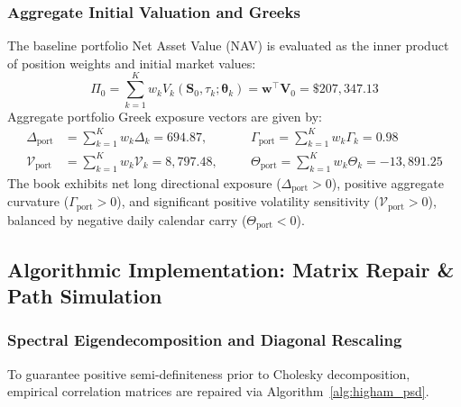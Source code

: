 \documentclass{article}
\theoremstyle{plain}
\theoremstyle{definition}
\theoremstyle{remark}
\begin{document}
\subsubsection{Aggregate Initial Valuation and Greeks}
The baseline portfolio Net Asset Value (NAV) is evaluated as the inner product of position weights and initial market values:
\begin{equation}
    \Pi_0 = \sum_{k=1}^K w_k V_k(\mathbf{S}_0, \tau_k; \boldsymbol{\theta}_k) = \mathbf{w}^\top \mathbf{V}_0 = \$207,347.13
\end{equation}
Aggregate portfolio Greek exposure vectors are given by:
\begin{align}
    \Delta_{\text{port}} &= \sum_{k=1}^K w_k \Delta_k = 694.87, \quad && \Gamma_{\text{port}} = \sum_{k=1}^K w_k \Gamma_k = 0.98 \\
    \mathcal{V}_{\text{port}} &= \sum_{k=1}^K w_k \mathcal{V}_k = 8,797.48, \quad && \Theta_{\text{port}} = \sum_{k=1}^K w_k \Theta_k = -13,891.25
\end{align}
The book exhibits net long directional exposure ($\Delta_{\text{port}} > 0$), positive aggregate curvature ($\Gamma_{\text{port}} > 0$), and significant positive volatility sensitivity ($\mathcal{V}_{\text{port}} > 0$), balanced by negative daily calendar carry ($\Theta_{\text{port}} < 0$).

\subsection{Algorithmic Implementation: Matrix Repair \& Path Simulation}

\subsubsection{Spectral Eigendecomposition and Diagonal Rescaling}
To guarantee positive semi-definiteness prior to Cholesky decomposition, empirical correlation matrices are repaired via Algorithm~\ref{alg:higham_psd}.
\end{document}
